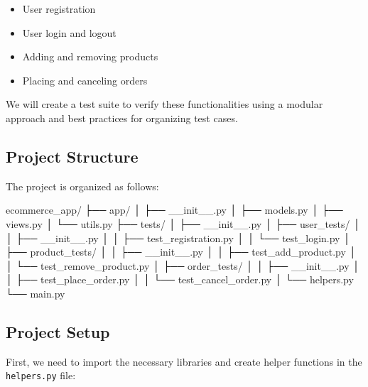 \documentclass[
  paper=a4,
  ,captions=tableheading
]{scrartcl}
\newenvironment{Shaded}{}{}
\newcommand{\NormalTok}[1]{#1}
\providecommand{\tightlist}{%
  \setlength{\itemsep}{0pt}\setlength{\parskip}{0pt}}
\begin{document}
\begin{itemize}
\tightlist
\item
  User registration
\item
  User login and logout
\item
  Adding and removing products
\item
  Placing and canceling orders
\end{itemize}

We will create a test suite to verify these functionalities using a
modular approach and best practices for organizing test cases.

\hypertarget{project-structure}{%
\subsection{Project Structure}\label{project-structure}}

The project is organized as follows:

\begin{Shaded}
\begin{Highlighting}[]
\NormalTok{ecommerce\_app/}
\NormalTok{  ├── app/}
\NormalTok{  │   ├── \_\_init\_\_.py}
\NormalTok{  │   ├── models.py}
\NormalTok{  │   ├── views.py}
\NormalTok{  │   └── utils.py}
\NormalTok{  ├── tests/}
\NormalTok{  │   ├── \_\_init\_\_.py}
\NormalTok{  │   ├── user\_tests/}
\NormalTok{  │   │   ├── \_\_init\_\_.py}
\NormalTok{  │   │   ├── test\_registration.py}
\NormalTok{  │   │   └── test\_login.py}
\NormalTok{  │   ├── product\_tests/}
\NormalTok{  │   │   ├── \_\_init\_\_.py}
\NormalTok{  │   │   ├── test\_add\_product.py}
\NormalTok{  │   │   └── test\_remove\_product.py}
\NormalTok{  │   ├── order\_tests/}
\NormalTok{  │   │   ├── \_\_init\_\_.py}
\NormalTok{  │   │   ├── test\_place\_order.py}
\NormalTok{  │   │   └── test\_cancel\_order.py}
\NormalTok{  │   └── helpers.py}
\NormalTok{  └── main.py}
\end{Highlighting}
\end{Shaded}

\hypertarget{project-setup}{%
\subsection{Project Setup}\label{project-setup}}

First, we need to import the necessary libraries and create helper
functions in the \texttt{helpers.py} file:
\end{document}
